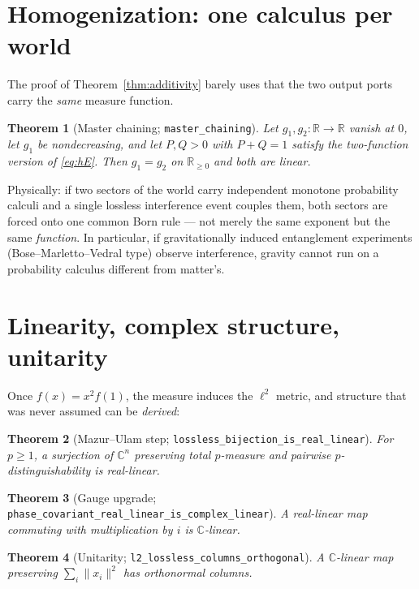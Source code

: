 \documentclass[11pt]{article}
\newtheorem{theorem}{Theorem}[section]
\newcommand{\R}{\mathbb{R}}
\newcommand{\C}{\mathbb{C}}
\newcommand{\norm}[1]{\lVert #1 \rVert}
\begin{document}
\section{Homogenization: one calculus per world}\label{sec:hom}

The proof of Theorem~\ref{thm:additivity} barely uses that the two
output ports carry the \emph{same} measure function.

\begin{theorem}[Master chaining; \texttt{master\_chaining}]
Let $g_1,g_2:\R\to\R$ vanish at $0$, let $g_1$ be nondecreasing, and
let $P,Q>0$ with $P+Q=1$ satisfy the two-function version of
\eqref{eq:hE}.  Then $g_1=g_2$ on $\R_{\ge0}$ and both are linear.
\end{theorem}

Physically: if two sectors of the world carry independent monotone
probability calculi and a single lossless interference event couples
them, both sectors are forced onto one common Born rule --- not merely
the same exponent but the same \emph{function}.  In particular, if
gravitationally induced entanglement experiments
(Bose--Marletto--Vedral type) observe interference, gravity cannot run
on a probability calculus different from matter's.

\section{Linearity, complex structure, unitarity}\label{sec:lin}

Once $f(x)=x^2f(1)$, the measure induces the $\ell^2$ metric, and
structure that was never assumed can be \emph{derived}:

\begin{theorem}[Mazur--Ulam step;
\texttt{lossless\_bijection\_is\_real\_linear}]
For $p\ge1$, a surjection of $\C^n$ preserving total $p$-measure and
pairwise $p$-distinguishability is real-linear.
\end{theorem}

\begin{theorem}[Gauge upgrade;
\texttt{phase\_covariant\_real\_linear\_is\_complex\_linear}]
A real-linear map commuting with multiplication by $i$ is
$\C$-linear.
\end{theorem}

\begin{theorem}[Unitarity; \texttt{l2\_lossless\_columns\_orthogonal}]
A $\C$-linear map preserving $\sum_i\norm{x_i}^2$ has orthonormal
columns.
\end{theorem}
\end{document}
